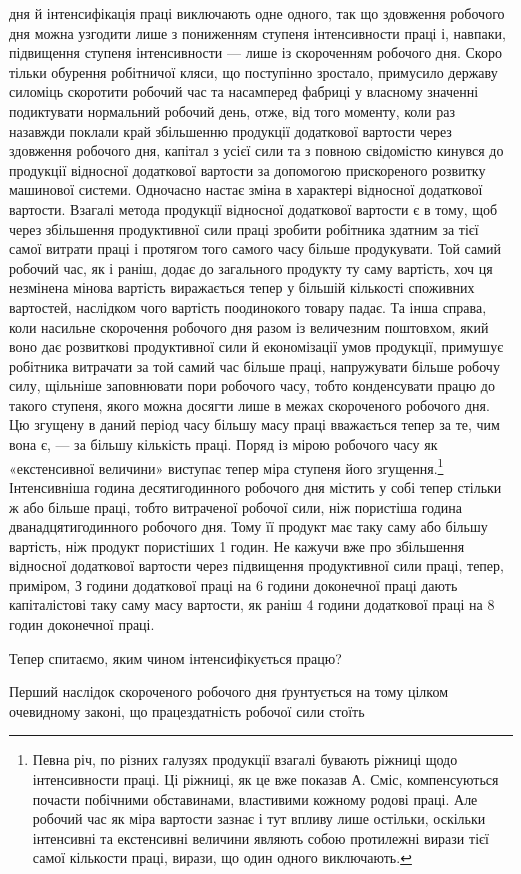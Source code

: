 \parcont{}  %
дня й інтенсифікація праці виключають одне одного, так що
здовження робочого дня можна узгодити лише з пониженням
ступеня інтенсивности праці і, навпаки, підвищення ступеня інтенсивности
— лише із скороченням робочого дня. Скоро тільки
обурення робітничої кляси, що поступінно зростало, примусило
державу силоміць скоротити робочий час та насамперед фабриці
у власному значенні подиктувати нормальний робочий день,
отже, від того моменту, коли раз назавжди поклали край збільшенню
продукції додаткової вартости через здовження робочого
дня, капітал з усієї сили та з повною свідомістю кинувся до продукції
відносної додаткової вартости за допомогою прискореного
розвитку машинової системи. Одночасно настає зміна в характері
відносної додаткової вартости. Взагалі метода продукції відносної
додаткової вартости є в тому, щоб через збільшення продуктивної
сили праці зробити робітника здатним за тієї самої витрати праці
і протягом того самого часу більше продукувати. Той самий
робочий час, як і раніш, додає до загального продукту ту саму
вартість, хоч ця незмінена мінова вартість виражається тепер у
більшій кількості споживних вартостей, наслідком чого вартість
поодинокого товару падає. Та інша справа, коли насильне скорочення
робочого дня разом із величезним поштовхом, який воно
дає розвиткові продуктивної сили й економізації умов продукції,
примушує робітника витрачати за той самий час більше праці,
напружувати більше робочу силу, щільніше заповнювати пори
робочого часу, тобто конденсувати працю до такого ступеня, якого
можна досягти лише в межах скороченого робочого дня. Цю
згущену в даний період часу більшу масу праці вважається тепер
за те, чим вона є, — за більшу кількість праці. Поряд із мірою
робочого часу як «екстенсивної величини» виступає тепер міра
ступеня його згущення.\footnote{
Певна річ, по різних галузях продукції взагалі бувають ріжниці
щодо інтенсивности праці. Ці ріжниці, як це вже показав А. Сміс, компенсуються
почасти побічними обставинами, властивими кожному родові
праці. Але робочий час як міра вартости зазнає і тут впливу лише остільки,
оскільки інтенсивні та екстенсивні величини являють собою протилежні
вирази тієї самої кількости праці, вирази, що один одного виключають.
} Інтенсивніша година десятигодинного
робочого дня містить у собі тепер стільки ж або більше праці,
тобто витраченої робочої сили, ніж пористіша година дванадцятигодинного
робочого дня. Тому її продукт має таку саму або більшу
вартість, ніж продукт пористіших 1 годин. Не кажучи вже про
збільшення відносної додаткової вартости через підвищення продуктивної
сили праці, тепер, приміром, З  години додаткової
праці на 6 години доконечної праці дають капіталістові таку
саму масу вартости, як раніш 4 години додаткової праці на 8 годин
доконечної праці.

Тепер спитаємо, яким чином інтенсифікується працю?

Перший наслідок скороченого робочого дня ґрунтується на тому
цілком очевидному законі, що працездатність робочої сили стоїть
\parbreak{}  %
